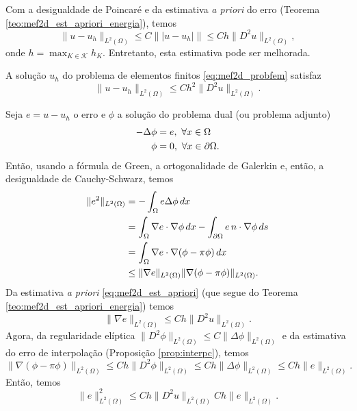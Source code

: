Com a desigualdade de Poincaré e da estimativa {\it a priori} do erro (Teorema \ref{teo:mef2d_est_apriori_energia}), temos
\begin{equation}\label{eq:mef2d_est_apriori}
  \|u-u_h\|_{L^2(\Omega)} \leq C \||u-u_h|\| \leq Ch\|D^2u\|_{L^2(\Omega)},
\end{equation}
onde $h = \max_{K\in\mathcal{K}} h_K$. Entretanto, esta estimativa pode ser melhorada.

\begin{teo}
  A solução $u_h$ do problema de elementos finitos \eqref{eq:mef2d_probfem} satisfaz
  \begin{equation}
    \|u-u_h\|_{L^2(\Omega)} \leq Ch^2\|D^2u\|_{L^2(\Omega)}.
  \end{equation}
\end{teo}
\begin{dem}
  Seja $e = u-u_h$ o erro e $\phi$ a solução do problema dual (ou problema adjunto)
  \begin{align}
    -\Delta \phi &= e,~\forall x\in\Omega\\
    \phi &= 0,~\forall x\in\partial\Omega.
  \end{align}
Então, usando a fórmula de Green, a ortogonalidade de Galerkin e, então, a desigualdade de Cauchy-Schwarz, temos
\begin{align}
  \|e^2\|_{L^2(\Omega)} &= -\int_\Omega e\Delta\phi\,dx\\
  &=\int_\Omega \nabla e\cdot\nabla\phi\,dx - \int_{\partial\Omega} e\,n\cdot\nabla \phi\,ds\\
  &=\int_\Omega \nabla e\cdot\nabla(\phi-\pi\phi)\,dx\\
  &\leq\|\nabla e\|_{L^2(\Omega)}\|\nabla(\phi-\pi\phi)\|_{L^2(\Omega)}.
\end{align}
Da estimativa {\it a priori} \eqref{eq:mef2d_est_apriori} (que segue do Teorema \ref{teo:mef2d_est_apriori_energia}) temos
\begin{equation}
  \|\nabla e\|_{L^2(\Omega)} \leq Ch\|D^2u\|_{L^2(\Omega)}.
\end{equation}
Agora, da regularidade elíptica $\|D^2\phi\|_{L^2(\Omega)} \leq C\|\Delta\phi\|_{L^2(\Omega)}$ \cite{Evans1998a} e da estimativa do erro de interpolação (Proposição \ref{prop:interpc}), temos
\begin{equation}
  \|\nabla(\phi-\pi\phi)\|_{L^2(\Omega)} \leq Ch\|D^2\phi\|_{L^2(\Omega)}\leq Ch\|\Delta\phi\|_{L^2(\Omega)} \leq Ch\|e\|_{L^2(\Omega)}.
\end{equation}
Então, temos
\begin{equation}
  \|e\|_{L^2(\Omega)}^2 \leq Ch\|D^2u\|_{L^2(\Omega)}Ch\|e\|_{L^2(\Omega)}.
\end{equation}
\end{dem}

